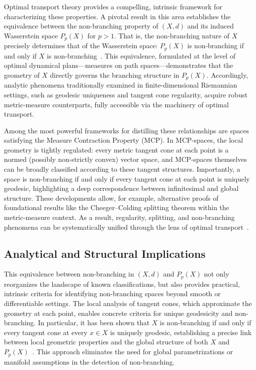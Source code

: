 \documentclass[sigconf]{acmart}
\begin{document}
Optimal transport theory provides a compelling, intrinsic framework for characterizing these properties. A pivotal result in this area establishes the equivalence between the non-branching property of $(X, d)$ and its induced Wasserstein space $P_p(X)$ for $p > 1$. That is, the non-branching nature of $X$ precisely determines that of the Wasserstein space: $P_p(X)$ is non-branching if and only if $X$ is non-branching~\cite{ref107}. This equivalence, formulated at the level of optimal dynamical plans—measures on path spaces—demonstrates that the geometry of $X$ directly governs the branching structure in $P_p(X)$. Accordingly, analytic phenomena traditionally examined in finite-dimensional Riemannian settings, such as geodesic uniqueness and tangent cone regularity, acquire robust metric-measure counterparts, fully accessible via the machinery of optimal transport.

Among the most powerful frameworks for distilling these relationships are spaces satisfying the Measure Contraction Property (MCP). In MCP-spaces, the local geometry is tightly regulated: every metric tangent cone at each point is a normed (possibly non-strictly convex) vector space, and MCP-spaces themselves can be broadly classified according to these tangent structures. Importantly, a space is non-branching if and only if every tangent cone at each point is uniquely geodesic, highlighting a deep correspondence between infinitesimal and global structure. These developments allow, for example, alternative proofs of foundational results like the Cheeger–Colding splitting theorem within the metric-measure context. As a result, regularity, splitting, and non-branching phenomena can be systematically unified through the lens of optimal transport~\cite{ref107}.

\subsection{Analytical and Structural Implications}

This equivalence between non-branching in $(X, d)$ and $P_p(X)$ not only reorganizes the landscape of known classifications, but also provides practical, intrinsic criteria for identifying non-branching spaces beyond smooth or differentiable settings. The local analysis of tangent cones, which approximate the geometry at each point, enables concrete criteria for unique geodesicity and non-branching. In particular, it has been shown that $X$ is non-branching if and only if every tangent cone at every $x \in X$ is uniquely geodesic, establishing a precise link between local geometric properties and the global structure of both $X$ and $P_p(X)$~\cite{ref107}. This approach eliminates the need for global parametrizations or manifold assumptions in the detection of non-branching.
\end{document}
